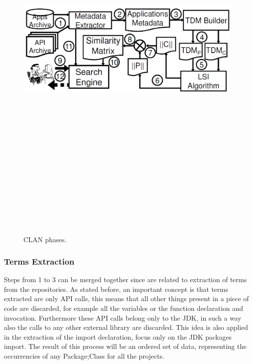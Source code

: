 \begin{figure}[H]
\includegraphics[width=15cm,height=20cm,keepaspectratio]{images/Clan.png}
\centering
\caption{CLAN phases.}
\end{figure}

\subsubsection{Terms Extraction}
Steps from 1 to 3 can be merged together since are related to extraction of terms from the repositories.
As stated before, an important concept is that terms extracted are only API calls, this means that all other things present in a piece of code are discarded, for example all the variables or the function declaration and invocation. Furthermore these API calls belong only to the JDK, in such a way also the calls to any other external library are discarded. This idea is also applied in the extraction of the import declaration, focus only on the JDK packages import.
The result of this process will be an ordered set of data, representing the occurrencies of any Package;Class for all the projects.

